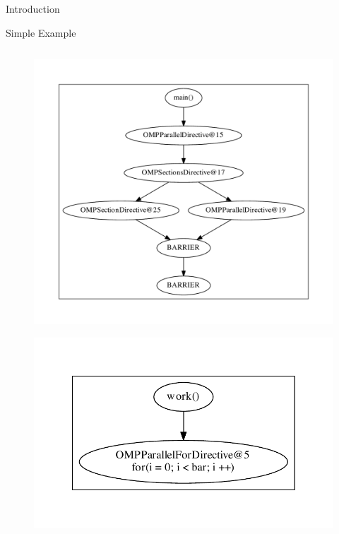 \documentclass[xcolor=dvipsnames]{beamer}
\begin{document}
\begin{section}{Introduction}
\begin{frame}[fragile]{\hskip 0.3cm Simple Example}
\begin{columns}
\begin{column}{6.5cm}
\begin{figure}
\includegraphics[scale=0.3]{main.pdf}
\end{figure}
\vskip -1.5cm
\begin{figure}
\includegraphics[scale=0.3]{work.pdf}
\end{figure}

\end{column}

\end{columns}

\end{frame}



















\end{section}
\end{document}
